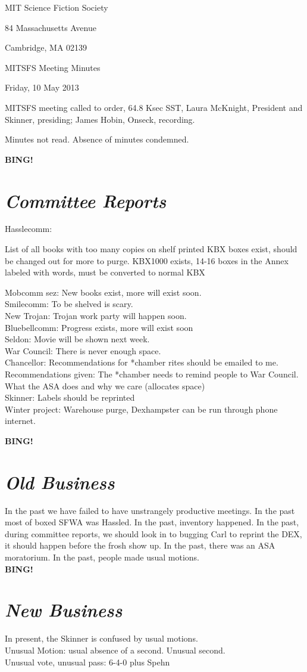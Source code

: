 \documentclass[10pt]{article}
\newcommand{\bing}{{\bf BING!} }
\newcommand{\goto}[1]{\bing \vskip 12pt \section*{{\em{#1}}}}
\newcommand{\ps}{ plus Spehn\xspace}
\newcommand{\skinner}{Laura McKnight, President and Skinner}
\newcommand{\onseck}{James Hobin, Onseck}
\newcommand{\meetingdate}{Friday, 10 May 2013}
\begin{document}
\begin{center}

MIT Science Fiction Society

84 Massachusetts Avenue

Cambridge, MA 02139

\vspace{12pt}

MITSFS Meeting Minutes

\meetingdate

\end{center}

\vspace{18pt}

\setlength{\parskip}{6pt}

\noindent
MITSFS meeting called to order, 64.8 Ksec SST,
\skinner, presiding; \onseck, recording.


Minutes not read.
Absence of minutes condemned.

\goto{Committee Reports}
Hasslecomm:
\begin{itemize}
  List of all books with too many copies on shelf printed
  KBX boxes exist, should be changed out for more to purge.
  KBX1000 exists, 14-16 boxes in the Annex labeled with words, must be converted to normal KBX
\end{itemize}
Mobcomm sez: New books exist, more will exist soon. \\
Smilecomm: To be shelved is scary. \\
New Trojan: Trojan work party will happen soon. \\
Bluebellcomm: Progress exists, more will exist soon \\
Seldon: Movie will be shown next week. \\
War Council: There is never enough space. \\
Chancellor: Recommendations for *chamber rites should be emailed to me. Recommendations given:
The *chamber needs to remind people to War Council. What the ASA does and why we care (allocates space) \\
Skinner: Labels should be reprinted \\
Winter project: Warehouse purge, Dexhampster can be run through phone internet.

\goto{Old Business}

In the past we have failed to have unstrangely productive meetings. In the past
most of boxed SFWA was Hassled. In the past, inventory happened. In the past,
during committee reports, we should look in to bugging Carl to reprint the DEX,
it should happen before the frosh show up. In the past, there was an ASA moratorium.
In the past, people made usual motions. \\
\goto{New Business}
In present, the Skinner is confused by usual motions. \\
Unusual Motion: usual absence of a second. Unusual second. \\
Unusual vote, unusual pass: 6-4-0 \ps
\end{document}
